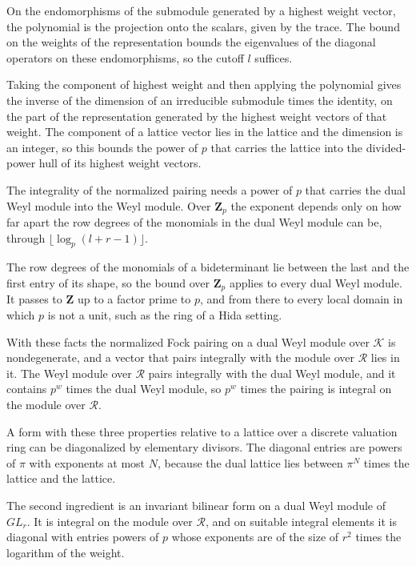 On the endomorphisms of the submodule generated by a highest weight vector, the polynomial is the
projection onto the scalars, given by the trace. The bound on the weights of the representation bounds
the eigenvalues of the diagonal operators on these endomorphisms, so the cutoff $l$ suffices.

Taking the component of highest weight and then applying the polynomial gives the inverse of the
dimension of an irreducible submodule times the identity, on the part of the representation generated
by the highest weight vectors of that weight. The component of a lattice vector lies in the lattice
and the dimension is an integer, so this bounds the power of $p$ that carries the lattice into the
divided-power hull of its highest weight vectors.

The integrality of the normalized pairing needs a power of $p$ that carries the dual Weyl module
into the Weyl module. Over $\mathbf Z_p$ the exponent depends only on how far apart the row degrees of
the monomials in the dual Weyl module can be, through $\lfloor\log_p(l+r-1)\rfloor$.

The row degrees of the monomials of a bideterminant lie between the last and the first entry of its
shape, so the bound over $\mathbf Z_p$ applies to every dual Weyl module. It passes to $\mathbf Z$ up
to a factor prime to $p$, and from there to every local domain in which $p$ is not a unit, such as
the ring of a Hida setting.

With these facts the normalized Fock pairing on a dual Weyl module over $\mathcal K$ is nondegenerate,
and a vector that pairs integrally with the module over $\mathcal R$ lies in it. The Weyl module over
$\mathcal R$ pairs integrally with the dual Weyl module, and it contains $p^w$ times the dual Weyl
module, so $p^w$ times the pairing is integral on the module over $\mathcal R$.

A form with these three properties relative to a lattice over a discrete valuation ring can be
diagonalized by elementary divisors. The diagonal entries are powers of $\pi$ with exponents at most
$N$, because the dual lattice lies between $\pi^N$ times the lattice and the lattice.

The second ingredient is an invariant bilinear form on a dual Weyl module of $GL_r$. It is integral on
the module over $\mathcal R$, and on suitable integral elements it is diagonal with entries powers of
$p$ whose exponents are of the size of $r^2$ times the logarithm of the weight.


